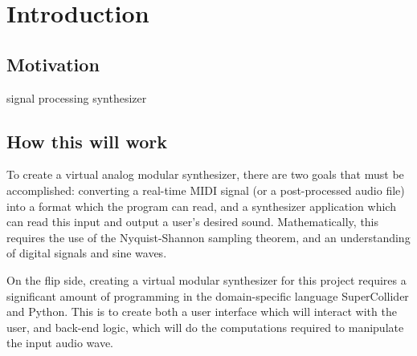 \chapter{Introduction}\label{intro}

\section[Motivation]{Motivation}\label{motivation}
signal processing
synthesizer



\section[How this will work]{How this will work}\label{how-it-works}

To create a virtual analog modular synthesizer, there are two goals that must be accomplished: converting a real-time MIDI signal (or a post-processed audio file) into a format which the program can read, and a synthesizer application which can read this input and output a user's desired sound. Mathematically, this requires the use of the Nyquist-Shannon sampling theorem, and an understanding of digital signals and sine waves. 

On the flip side, creating a virtual modular synthesizer for this project requires a significant amount of programming in the domain-specific language SuperCollider and Python. This is to create both a user interface which will interact with the user, and back-end logic, which will do the computations required to manipulate the input audio wave.